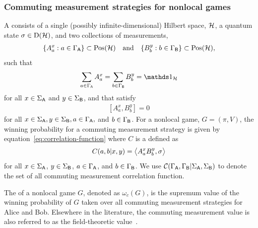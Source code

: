 \subsubsection*{Commuting measurement strategies for nonlocal games}
\label{sec:commuting-measurement-strategies-for-nonlocal-games}

A  consists of a single (possibly infinite-dimensional) Hilbert space, $\mathcal{H}$, a quantum state $\sigma \in \mathrm{D}(\mathcal{H})$, and two collections of measurements, 
\begin{align}
	\{ A_a^x : a \in \Gamma_{\mathsf{A}} \} \subset \mathrm{Pos}(\mathcal{H}) \quad \textnormal{and} \quad \{ B_b^y : b \in \Gamma_{\mathsf{B}} \} \subset \mathrm{Pos}(\mathcal{H}),
\end{align}
such that 
\begin{align}
	\sum_{a \in \GammaA} A_a^x = \sum_{b \in \GammaB} B_b^y = \I_{\H}
\end{align}
for all $x \in \Sigma_{\mathsf{A}}$ and $y \in \Sigma_{\mathsf{B}}$, and that satisfy
\begin{align}
	\left[ A_a^x, B_b^y \right] = 0
\end{align}
for all $x \in \Sigma_{\mathsf{A}}, y \in \Sigma_{\mathsf{B}}, a \in \Gamma_{\mathsf{A}},$ and $b \in \Gamma_{\mathsf{B}}$. For a nonlocal game, $G = (\pi,V)$, the winning probability for a commuting measurement strategy is given by equation~\eqref{eq:correlation-function} where $C$ is a  defined as 
\begin{align}
	C(a,b|x,y) = \bigl\langle A_a^x B_b^y, \sigma \bigr\rangle
\end{align}
for all $x \in \Sigma_{\mathsf{A}}$, $y \in \Sigma_{\mathsf{B}}$, $a \in \Gamma_{\mathsf{A}}$, and $b \in \Gamma_{\mathsf{B}}$. We use $\mathcal{C}(\Gamma_{\mathsf{A}}, \Gamma_{\mathsf{B}} | \Sigma_{\mathsf{A}}, \Sigma_{\mathsf{B}})$ to denote the set of all commuting measurement correlation function. 

The  of a nonlocal game $G$, denoted as $\omega_c(G)$, is the supremum value of the winning probability of $G$ taken over all commuting measurement strategies for Alice and Bob. Elsewhere in the literature, the commuting measurement value is also referred to as the field-theoretic value~\cite{Doherty2008}. 

